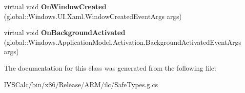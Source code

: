 \begin{DoxyCompactItemize}
\item 
\mbox{\label{class_windows_1_1_u_i_1_1_xaml_1_1_application_a69d851136f5764f6fb1d953b4447219f}} 
virtual void {\bfseries On\+Window\+Created} (global\+::\+Windows.\+U\+I.\+Xaml.\+Window\+Created\+Event\+Args args)
\item 
\mbox{\label{class_windows_1_1_u_i_1_1_xaml_1_1_application_a99448e12dcdd4516781f0aba248db35e}} 
virtual void {\bfseries On\+Background\+Activated} (global\+::\+Windows.\+Application\+Model.\+Activation.\+Background\+Activated\+Event\+Args args)
\end{DoxyCompactItemize}


The documentation for this class was generated from the following file\+:\begin{DoxyCompactItemize}
\item 
I\+V\+S\+Calc/bin/x86/\+Release/\+A\+R\+M/ilc/Safe\+Types.\+g.\+cs\end{DoxyCompactItemize}
